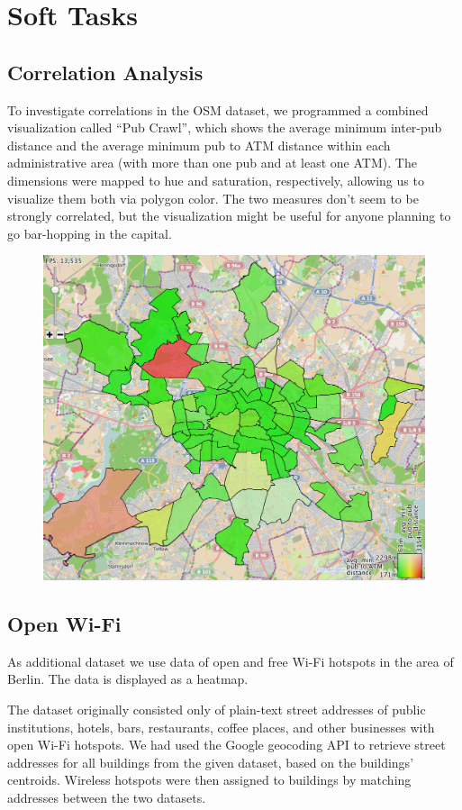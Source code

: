 \section*{Soft Tasks}
\subsection*{Correlation Analysis}

To investigate correlations in the OSM dataset, we programmed a combined visualization called ``Pub Crawl'', which shows the average minimum inter-pub distance and the average minimum pub to ATM distance within each administrative area (with more than one pub and at least one ATM). The dimensions were mapped to hue and saturation, respectively, allowing us to visualize them both via polygon color. The two measures don't seem to be strongly correlated, but the visualization might be useful for anyone planning to go bar-hopping in the capital.

\begin{figure}
\centering
\includegraphics[width=0.9\linewidth]{imgs/crawl}
\caption{\todo{}}
\label{fig:crawl}
\end{figure}

\subsection*{Open Wi-Fi}

As additional dataset we use data of open and free Wi-Fi hotspots in
the area of Berlin.
The data is displayed as a heatmap.

The dataset originally consisted only of plain-text street addresses
of public institutions, hotels, bars, restaurants, coffee places, and other businesses with open Wi-Fi hotspots. We had used the Google geocoding API to retrieve street addresses for all buildings from the given dataset, based on the buildings' centroids. Wireless hotspots were then assigned to buildings by matching addresses between the two datasets.

